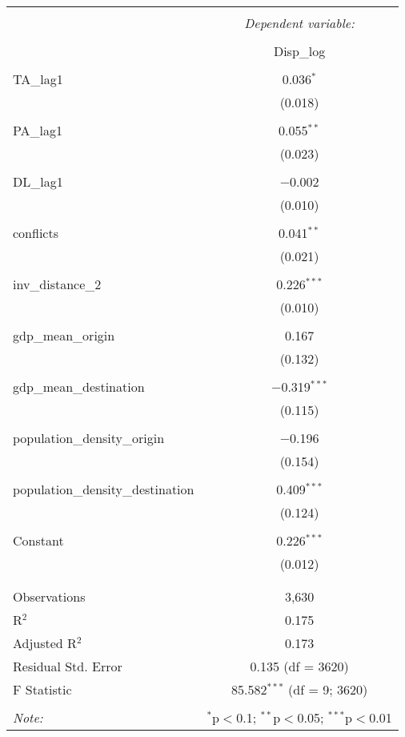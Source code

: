 
\begin{table}[!htbp] \centering 
  \caption{} 
  \label{} 
\begin{tabular}{@{\extracolsep{5pt}}lc} 
\\[-1.8ex]\hline 
\hline \\[-1.8ex] 
 & \multicolumn{1}{c}{\textit{Dependent variable:}} \\ 
\cline{2-2} 
\\[-1.8ex] & Disp\_log \\ 
\hline \\[-1.8ex] 
 TA\_lag1 & 0.036$^{*}$ \\ 
  & (0.018) \\ 
  & \\ 
 PA\_lag1 & 0.055$^{**}$ \\ 
  & (0.023) \\ 
  & \\ 
 DL\_lag1 & $-$0.002 \\ 
  & (0.010) \\ 
  & \\ 
 conflicts & 0.041$^{**}$ \\ 
  & (0.021) \\ 
  & \\ 
 inv\_distance\_2 & 0.226$^{***}$ \\ 
  & (0.010) \\ 
  & \\ 
 gdp\_mean\_origin & 0.167 \\ 
  & (0.132) \\ 
  & \\ 
 gdp\_mean\_destination & $-$0.319$^{***}$ \\ 
  & (0.115) \\ 
  & \\ 
 population\_density\_origin & $-$0.196 \\ 
  & (0.154) \\ 
  & \\ 
 population\_density\_destination & 0.409$^{***}$ \\ 
  & (0.124) \\ 
  & \\ 
 Constant & 0.226$^{***}$ \\ 
  & (0.012) \\ 
  & \\ 
\hline \\[-1.8ex] 
Observations & 3,630 \\ 
R$^{2}$ & 0.175 \\ 
Adjusted R$^{2}$ & 0.173 \\ 
Residual Std. Error & 0.135 (df = 3620) \\ 
F Statistic & 85.582$^{***}$ (df = 9; 3620) \\ 
\hline 
\hline \\[-1.8ex] 
\textit{Note:}  & \multicolumn{1}{r}{$^{*}$p$<$0.1; $^{**}$p$<$0.05; $^{***}$p$<$0.01} \\ 
\end{tabular} 
\end{table} 
